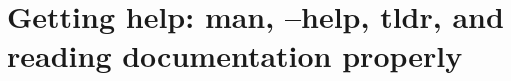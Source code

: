\chapter{Getting help: man, --help, tldr, and reading documentation properly}
\label{ch:getting-help-man-help-tldr-and-reading}

